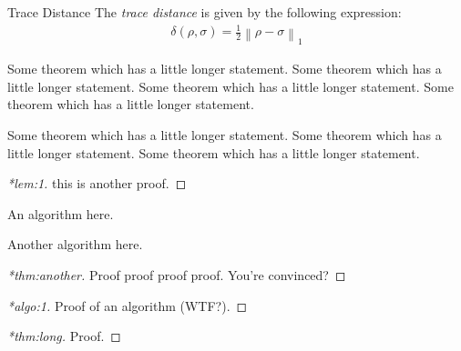 \documentclass[12pt,a5paper]{article}
\begin{document}
\begin{thmheading}{Trace Distance}
  \label{thmheading:trace-dist}
  The \emph{trace distance} is given by the following expression:
  \begin{align}
    \delta(\rho,\sigma) = \frac12 \left\lVert \rho - \sigma \right\rVert_1
  \end{align}
\end{thmheading}

\begin{theorem}
  \label{thm:long}
  Some theorem which has a little longer statement.
  Some theorem which has a little longer statement.
  Some theorem which has a little longer statement.
  Some theorem which has a little longer statement.

  Some theorem which has a little longer statement.
  Some theorem which has a little longer statement.
  Some theorem which has a little longer statement.
\end{theorem}

\cleardoublepage

\begin{proof}[*lem:1]
  this is another proof.
\end{proof}

\begin{algorithm}
  \label{algo:1}
  An algorithm here.
\end{algorithm}

\begin{algorithm}
  \label{algo:2}
  Another algorithm here.
\end{algorithm}

\cleardoublepage

\begin{proof}[*thm:another]
  Proof proof proof proof. You're convinced?
\end{proof}

\begin{proof}[*algo:1]
  Proof of an algorithm (WTF?).
\end{proof}

\begin{proof}[*thm:long]
  Proof.
\end{proof}
\end{document}
